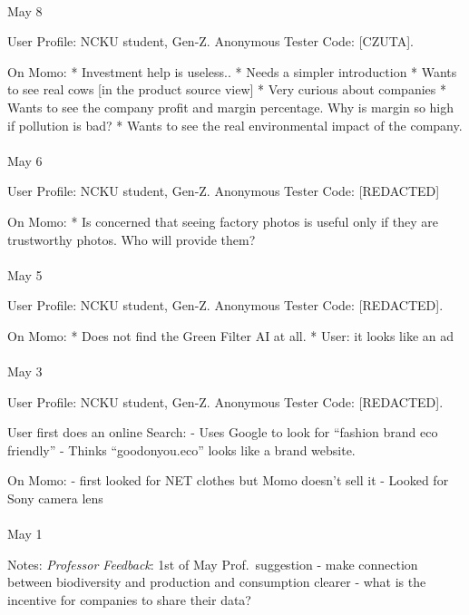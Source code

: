 \documentclass[
  12pt,
  letterpaper,
  DIV=11,
  numbers=noendperiod]{scrartcl}
\makeatletter
\let\oldparagraph\paragraph
\renewcommand{\paragraph}{
    \@ifstar
      \xxxParagraphStar
      \xxxParagraphNoStar
  }
\newcommand{\xxxParagraphStar}[1]{\oldparagraph*{#1}\mbox{}}
\newcommand{\xxxParagraphNoStar}[1]{\oldparagraph{#1}\mbox{}}
\makeatother
\begin{document}
\paragraph{May 8}\label{may-8}

User Profile: NCKU student, Gen-Z. Anonymous Tester Code: {[}CZUTA{]}.

On Momo: * Investment help is useless.. * Needs a simpler introduction *
Wants to see real cows {[}in the product source view{]} * Very curious
about companies * Wants to see the company profit and margin percentage.
Why is margin so high if pollution is bad? * Wants to see the real
environmental impact of the company.

\paragraph{May 6}\label{may-6}

User Profile: NCKU student, Gen-Z. Anonymous Tester Code: {[}REDACTED{]}

On Momo: * Is concerned that seeing factory photos is useful only if
they are trustworthy photos. Who will provide them?

\paragraph{May 5}\label{may-5}

User Profile: NCKU student, Gen-Z. Anonymous Tester Code:
{[}REDACTED{]}.

On Momo: * Does not find the Green Filter AI at all. * User: it looks
like an ad

\paragraph{May 3}\label{may-3}

User Profile: NCKU student, Gen-Z. Anonymous Tester Code:
{[}REDACTED{]}.

User first does an online Search: - Uses Google to look for ``fashion
brand eco friendly'' - Thinks ``goodonyou.eco'' looks like a brand
website.

On Momo: - first looked for NET clothes but Momo doesn't sell it -
Looked for Sony camera lens

\paragraph{May 1}\label{may-1}

Notes: \emph{Professor Feedback}: 1st of May Prof.~suggestion - make
connection between biodiversity and production and consumption clearer -
what is the incentive for companies to share their data?
\end{document}
